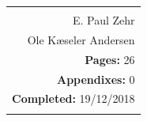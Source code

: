 \begin{titlepage}
{\begin{tabular}{r}
{	
	\textbf{Supervisors:}\\
	E. Paul Zehr \\
	Ole Kæseler Andersen\\
	
	\textbf{Pages:} 26\\
	\textbf{Appendixes:} 0 \\
	\textbf{Completed:} 19/12/2018\\
}
	
		\hfill \hspace{0.5cm} \parbox{10cm}{\begin{tabular}{l} %
				\fbox{
					\parbox{9.3cm}{\bigskip
						{\vfill{\small 
								\bigskip}}
				}}
	\end{tabular}}
\end{tabular}}


\end{titlepage}
%